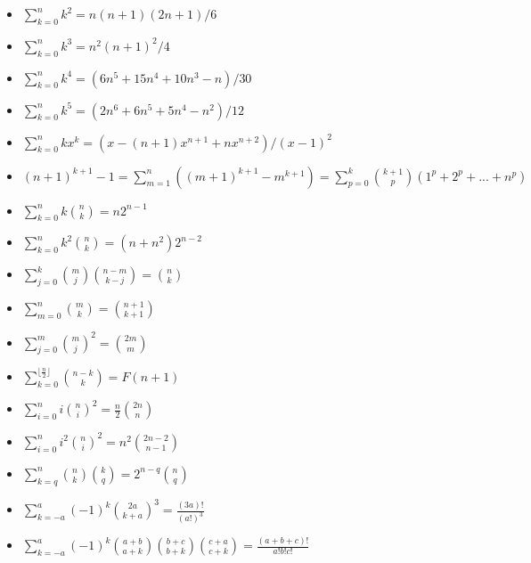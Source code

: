 \usepackage{mathtools}

\begin{itemize}
    \item $\sum_{k=0}^{n} k^2 = n(n+1)(2n+1)/6$
    \item $\sum_{k=0}^{n} k^3 = n^2(n+1)^2/4$
    \item $\sum_{k=0}^{n} k^4 = (6n^5+15n^4+10n^3-n)/30$
    \item $\sum_{k=0}^{n} k^5 = (2n^6+6n^5+5n^4-n^2)/12$
    \item $\sum_{k=0}^{n} kx^{k} = (x - (n+1)x^{n+1} + nx^{n+2}) / (x-1)^2$
    \item $(n+1)^{k+1} - 1 = \sum_{m=1}^{n} ((m+1)^{k+1} - m^{k+1}) = \sum_{p=0}^{k} \binom{k+1}{p}(1^p + 2^p + ... + n^p)$
    \item $\sum_{k=0}^{n} k \binom{n}{k} = n2^{n-1}$
    \item $\sum_{k=0}^{n} k^2 \binom{n}{k} = (n + n^2)2^{n-2}$
    \item $\sum_{j=0}^{k} \binom{m}{j} \binom{n-m}{k-j} = \binom{n}{k}$
    \item $\sum_{m=0}^{n} \binom{m}{k} = \binom{n+1}{k+1}$
    \item $\sum_{j=0}^{m} \binom{m}{j}^2 = \binom{2m}{m}$
    \item $\sum_{k=0}^{\lfloor\frac{n}{2}\rfloor} \binom{n-k}{k} = F(n+1)$
    \item $\sum_{i=0}^{n} i \binom{n}{i}^2 = \frac{n}{2} \binom{2n}{n}$
    \item $\sum_{i=0}^{n} i^2 \binom{n}{i}^2 = n^2 \binom{2n-2}{n-1}$
    \item $\sum_{k=q}^{n} \binom{n}{k}\binom{k}{q} = 2^{n-q}\binom{n}{q}$
    \item $\sum_{k=-a}^{a} (-1)^k \binom{2a}{k+a}^3 = \frac{(3a)!}{(a!)^3}$
    \item $\sum_{k=-a}^{a} (-1)^k \binom{a+b}{a+k}\binom{b+c}{b+k}\binom{c+a}{c+k} = \frac{(a+b+c)!}{a!b!c!}$
\end{itemize}

